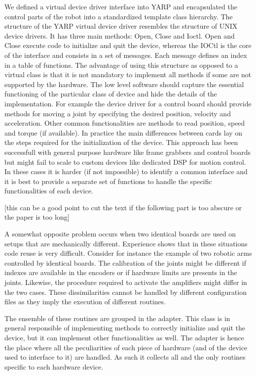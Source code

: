 We defined a virtual device driver interface into YARP and encapsulated the control parts of the robot into a standardized template class hierarchy. The structure of the YARP virtual device driver resembles the structure of UNIX device drivers. It has three main methods: Open, Close and Ioctl. Open and Close execute code to initialize and quit the device, whereas the IOCtl is the core of the interface and consists in a set of messages. Each message defines an index in a table of functions. The advantage of using this structure as opposed to a virtual class is that it is not mandatory to implement all methods if some are not supported by the hardware. 
The low level software should capture the essential functioning of the particular class of device and hide the details of the implementation. For example the device driver for a control board should provide methods for moving a joint by specifying the desired position, velocity and acceleration. Other common functionalities are methods to read position, speed and torque (if available). In practice the main differences between cards lay on the steps required for the initialization of the device. This approach has been successfull with general purpose hardware like frame grabbers and control boards but might fail to scale to custom devices like dedicated DSP for motion control. In these cases it is harder (if not impossible) to identify a common interface and it is best to provide a separate set of functions to handle the specific functionalities of each device. 

[this can be a good point to cut the text if the following part is too abscure or the paper is too long]

A somewhat opposite problem occurs when two identical boards are used on setups that are mechanically different. Experience shows that in these situations code reuse is very difficult. Consider for instance the example of two robotic arms controlled by identical boards. The calibration of the joints might be different if indexes are available in the encoders or if hardware limits are presents in the joints. Likewise, the procedure required to activate the amplifiers might differ in the two cases. These dissimilarities cannot be handled by different configuration files as they imply the execution of different routines.

The ensemble of these routines are grouped in the adapter. This class is in general responsible of implementing methods to correctly initialize and quit the device, but it can implement other functionalities as well. The adapter is hence the place where all the peculiarities of each piece of hardware (and of the device used to interface to it) are handled. As such it collects all and the only routines specific to each hardware device. 

